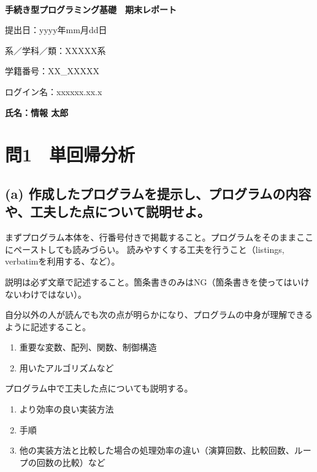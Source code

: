 \documentclass[a4j,11pt]{jarticle}
\begin{document}
\begin{center}
　\vspace{10mm}

{\bf {\huge 手続き型プログラミング基礎　期末レポート}}

\vspace{80mm}

提出日：yyyy年mm月dd日

\vspace{10mm}

系／学科／類：XXXXX系

\vspace{10mm}

学籍番号：XX\_{}XXXXX

\vspace{10mm}

ログイン名：xxxxxx.xx.x

\vspace{20mm}

{\bf {\LARGE 氏名：情報 太郎}}
\end{center}

\newpage

\section{問1　単回帰分析}
\subsection*{(a) 作成したプログラムを提示し、プログラムの内容や、工夫した点について説明せよ。}
まずプログラム本体を、行番号付きで掲載すること。プログラムをそのままここにペーストしても読みづらい。
読みやすくする工夫を行うこと（listings, verbatimを利用する、など）。

説明は必ず文章で記述すること。箇条書きのみはNG（箇条書きを使ってはいけないわけではない）。

自分以外の人が読んでも次の点が明らかになり、プログラムの中身が理解できるように記述すること。

\begin{enumerate}
  \item 重要な変数、配列、関数、制御構造
  \item 用いたアルゴリズムなど
\end{enumerate}

プログラム中で工夫した点についても説明する。

\begin{enumerate}
  \item より効率の良い実装方法
  \item 手順
  \item 他の実装方法と比較した場合の処理効率の違い（演算回数、比較回数、ループの回数の比較）など
\end{enumerate}
\end{document}

